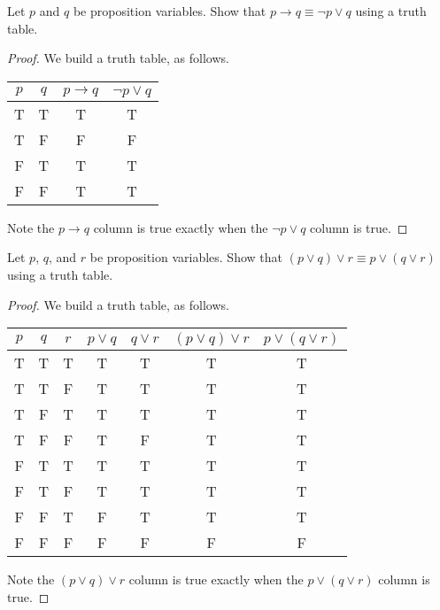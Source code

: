 \documentclass[../main.tex]{subfiles}
\begin{document}
\begin{example} \label{exe:logical-conditional}
    Let $p$ and $q$ be proposition variables. Show that $p \rightarrow q  \equiv \neg p \lor q$ using a truth table.
\end{example}
\begin{proof}
    We build a truth table, as follows.
    \begin{center}
        \begin{tabular}{c|c|c|c}
            $p$ & $q$ & $p\to q$ & $\lnot p\lor q$ \\\hline
            T & T & T & T \\
            T & F & F & F \\
            F & T & T & T \\
            F & F & T & T
        \end{tabular}
    \end{center}
    Note the $p\to q$ column is true exactly when the $\lnot p\lor q$ column is true.
\end{proof}
\begin{example}
    Let $p$, $q$, and $r$ be proposition variables. Show that $(p \lor q) \lor r \equiv p \lor (q \lor r)$ using a truth table.
\end{example}
\begin{proof}
    We build a truth table, as follows.
    \begin{center}
        \begin{tabular}{c|c|c|c|c|c|c}
             $p$ & $q$ & $r$ & $p \lor q$ & $q \lor r$ & $(p \lor q) \lor r$ & $p \lor (q \lor r)$  \\
             \hline
             T & T & T & T &  T & T & T \\
             T & T & F & T &  T & T & T \\
             T & F & T & T &  T & T & T \\
             T & F & F & T &  F & T & T \\
             F & T & T & T &  T & T & T \\
             F & T & F & T &  T & T & T \\
             F & F & T & F &  T & T & T \\
             F & F & F & F &  F & F & F \\
        \end{tabular}
    \end{center}
    Note the $(p\lor q)\lor r$ column is true exactly when the $p\lor(q\lor r)$ column is true.
\end{proof}
\end{document}
